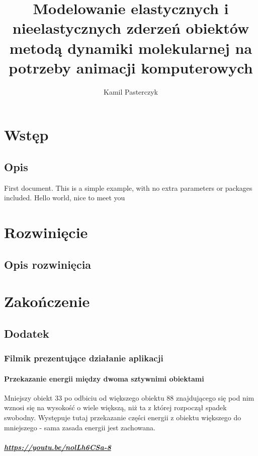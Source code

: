 \documentclass[12pt, letterpaper]{report}
\title{
    Modelowanie elastycznych i nieelastycznych zderzeń obiektów 
    metodą dynamiki molekularnej na potrzeby animacji komputerowych
}
\author{Kamil Pasterczyk}
\begin{document}
\maketitle
\tableofcontents

\chapter{Wstęp}
    \section{Opis}
    First document. This is a simple example, with no
    extra parameters or packages included. Hello world, nice to meet you

\chapter{Rozwinięcie}
    \section{Opis rozwinięcia}

\chapter{Zakończenie}
    \section{Dodatek}

    \subsection{Filmik prezentujące działanie aplikacji}

    \subsubsection{Przekazanie energii między dwoma sztywnimi obiektami}

    Mniejszy obiekt 33 po odbiciu od większego obiektu 88 znajdującego się pod nim wznosi się na
    wysokość o wiele większą, niż ta z której rozpoczął spadek swobodny.
    Występuje tutaj przekazanie części energii z obiektu większego do mniejszego - sama zasada energii jest zachowana.

    \paragraph{
        \url{https://youtu.be/nolLh6CSa-8}
    }
\end{document}
